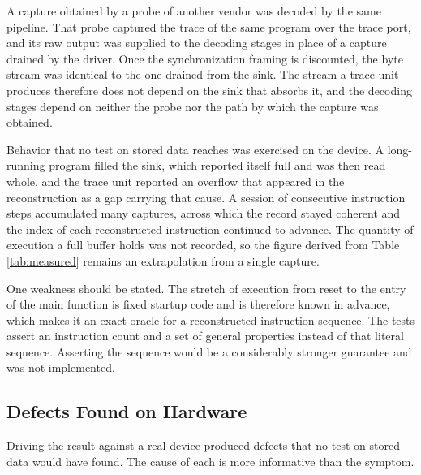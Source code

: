 A capture obtained by a probe of another vendor was decoded by the same pipeline. That probe captured the trace of the same program over the trace port, and its raw output was supplied to the decoding stages in place of a capture drained by the driver. Once the synchronization framing is discounted, the byte stream was identical to the one drained from the sink. The stream a trace unit produces therefore does not depend on the sink that absorbs it, and the decoding stages depend on neither the probe nor the path by which the capture was obtained.

Behavior that no test on stored data reaches was exercised on the device. A long-running program filled the sink, which reported itself full and was then read whole, and the trace unit reported an overflow that appeared in the reconstruction as a gap carrying that cause. A session of consecutive instruction steps accumulated many captures, across which the record stayed coherent and the index of each reconstructed instruction continued to advance. The quantity of execution a full buffer holds was not recorded, so the figure derived from Table \ref{tab:measured} remains an extrapolation from a single capture.

One weakness should be stated. The stretch of execution from reset to the entry of the main function is fixed startup code and is therefore known in advance, which makes it an exact oracle for a reconstructed instruction sequence. The tests assert an instruction count and a set of general properties instead of that literal sequence. Asserting the sequence would be a considerably stronger guarantee and was not implemented.

\subsection{Defects Found on Hardware}
\label{subsec:field_issues}
Driving the result against a real device produced defects that no test on stored data would have found. The cause of each is more informative than the symptom.

